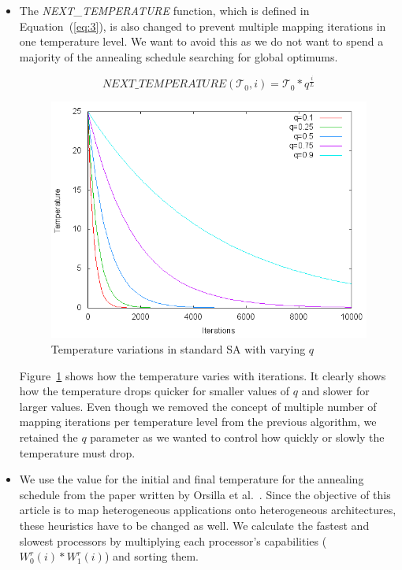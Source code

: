 \begin{itemize}
\item The \textit{NEXT\_TEMPERATURE} function, which is defined in
  Equation~(\ref{eq:3}), is also changed to prevent multiple mapping
  iterations in one temperature level. We want to avoid this as we do
  not want to spend a majority of the annealing schedule searching for
  global optimums.

\begin{equation}
  \textit{NEXT\_TEMPERATURE}(\mathcal{T}_0, i) =
  \mathcal{T}_0*q^{\frac{i}{L}}
\end{equation}

\begin{figure}[h!]
  \centering
  \includegraphics[scale=0.35]{./figures/temperature-drop}
  \caption{Temperature variations in standard SA with varying $q$}
  \label{fig:7}
\end{figure}
Figure~\ref{fig:7} shows how the temperature varies with iterations. It
clearly shows how the temperature drops quicker for smaller values of
$q$ and slower for larger values. Even though we removed the concept of
multiple number of mapping iterations per temperature level from the
previous algorithm, we retained the $q$ parameter as we wanted to
control how quickly or slowly the temperature must drop.

\item We use the value for the initial and final temperature for the
  annealing schedule from the paper written by Orsilla et
  al.~\cite{hors06}. Since the objective of this article is to map
  heterogeneous applications onto heterogeneous architectures, these
  heuristics have to be changed as well. We calculate the fastest and
  slowest processors by multiplying each processor's capabilities
  ($W^r_0(i) * W^r_1(i)$) and sorting them.


\end{itemize} 

